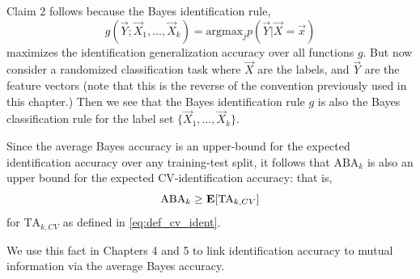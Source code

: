 Claim 2 follows because the Bayes identification rule,
\[
g(\vec{Y}; \vec{X}_1,\hdots, \vec{X}_k) = \text{argmax}_j p(\vec{Y}|\vec{X} = \vec{x})
\]
maximizes the identification generalization accuracy over all
functions $g$.  But now consider a randomized classification task
where $\vec{X}$ are the labels, and $\vec{Y}$ are the feature vectors
(note that this is the reverse of the convention previously used in
this chapter.)  Then we see that the Bayes identification rule $g$ is
also the Bayes classification rule for the label set $\{\vec{X}_1,
\hdots, \vec{X}_k\}$.

Since the average Bayes accuracy is an upper-bound for the expected
identification accuracy over any training-test split, it follows that
$\text{ABA}_k$ is also an upper bound for the expected
CV-identification accuracy: that is,
\begin{equation}\label{eq:aba_cv_ident_bound}
\text{ABA}_k \geq \textbf{E}[\text{TA}_{k, CV}]
\end{equation}
for $\text{TA}_{k, CV}$ as defined in \eqref{eq:def_cv_ident}.

We use this fact in Chapters 4 and 5 to link identification accuracy
to mutual information via the average Bayes accuracy.
